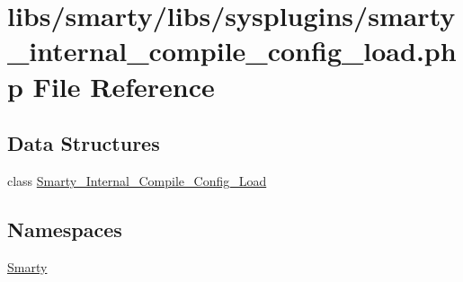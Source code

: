 \hypertarget{smarty__internal__compile__config__load_8php}{}\section{libs/smarty/libs/sysplugins/smarty\+\_\+internal\+\_\+compile\+\_\+config\+\_\+load.php File Reference}
\label{smarty__internal__compile__config__load_8php}
\subsection*{Data Structures}
\begin{DoxyCompactItemize}
\item 
class \hyperlink{class_smarty___internal___compile___config___load}{Smarty\+\_\+\+Internal\+\_\+\+Compile\+\_\+\+Config\+\_\+\+Load}
\end{DoxyCompactItemize}
\subsection*{Namespaces}
\begin{DoxyCompactItemize}
\item 
 \hyperlink{namespace_smarty}{Smarty}
\end{DoxyCompactItemize}
